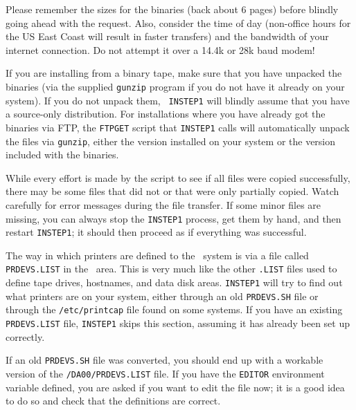
Please remember the sizes for the binaries (back about 6 pages) before
blindly going ahead with the request.  Also, consider the time of day
(non-office hours for the US East Coast will result in faster transfers)
and the bandwidth of your internet connection.  Do not attempt it over a
14.4k or 28k baud modem!

If you are installing from a binary tape, make sure that you have
unpacked the binaries (via the supplied {\tt gunzip} program if you do
not have it already on your system).  If you do not unpack them, {\tt
INSTEP1} will blindly assume that you have a source-only distribution.
For installations where you have already got the binaries via FTP, the
{\tt FTPGET} script that {\tt INSTEP1} calls will automatically unpack
the files via {\tt gunzip}, either the version installed on your system
or the version included with the binaries.

While every effort is made by the script to see if all files were copied
successfully, there may be some files that did not or that were only
partially copied.  Watch carefully for error messages during the file
transfer.
If some minor files are missing, you can always stop the {\tt INSTEP1}
process, get them by hand, and then restart {\tt INSTEP1}; it should
then proceed as if everything was successful.

\medskip{}

The way in which printers are defined to the \AIPS\ system is via a file
called {\tt PR\-DEVS.LIST} in the \ area.  This is very much like
the other {\tt *.LIST} files used to define tape drives, hostnames, and
data disk areas.  {\tt INSTEP1} will try to find out what printers are
on your system, either through an old {\tt PRDEVS.SH} file or through
the {\tt /etc/printcap} file found on some systems.  If you have an
existing {\tt PRDEVS.LIST} file, {\tt INSTEP1} skips this section,
assuming it has already been set up correctly.

If an old {\tt PRDEVS.SH} file was converted, you should end up with a
workable version of the {\tt\AROOT /DA00/PRDEVS.LIST} file.  If you have
the {\tt EDITOR} environment variable defined, you are asked if you want
to edit the file now; it is a good idea to do so and check that the
definitions are correct.

